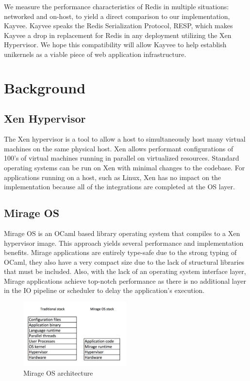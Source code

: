 \documentclass[english,10pt,twocolumn]{article}
\begin{document}
We measure the performance characteristics of Redis in multiple situations: networked and on-host, to yield a direct comparison to our implementation, Kayvee.
Kayvee speaks the Redis Serialization Protocol\cite{redis-protocol}, RESP, which makes Kayvee a drop in replacement for Redis in any deployment utilizing the Xen Hypervisor.
We hope this compatibility will allow Kayvee to help establish unikernels as a viable piece of web application infrastructure.


\section{Background}



\subsection{Xen Hypervisor}

The Xen hypervisor is a tool to allow a host to simultaneously host many virtual machines on the same physical host.
Xen allows performant configurations of 100's of virtual machines running in parallel on virtualized resources.
Standard operating systems can be run on Xen with minimal changes to the codebase.
For applications running on a host, such as Linux, Xen has no impact on the implementation because all of the integrations are completed at the OS layer.


\subsection{Mirage OS}

Mirage OS is an OCaml based library operating system that compiles to a Xen hypervisor image.
This approach yields several performance and implementation benefits.
Mirage applications are entirely type-safe due to the strong typing of OCaml, they also have a very compact size due to the lack of structural libraries that must be included.
Also, with the lack of an operating system interface layer, Mirage applications achieve top-notch performance as there is no additional layer in the IO pipeline or scheduler to delay the application's execution.

\begin{figure}[ht]
  \centering
  \caption{Mirage OS architecture}
  \includegraphics[width=0.5\textwidth]{images/design}
\end{figure}
\end{document}
